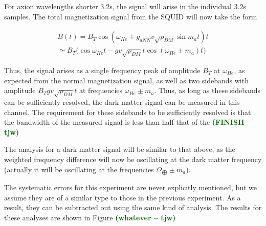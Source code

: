 \documentclass[aps,prd,final,letterpaper]{revtex4}
\newcommand{\tjw}[1]{\textbf{\textcolor{darkgreen}{(#1 -- tjw)}}}
\begin{document}
For axion wavelengths shorter $3.2$s, the signal will arise in the individual $3.2$s samples. The total magnetization signal from the SQUID will now take the form

\begin{align}
B(t) = B_T\cos{\left(\omega_{He} + g_{aNN}v\sqrt{\rho_{DM}}\sin{m_a t}\right)t} \\
\simeq B_T\bigg(\cos{\omega_{He}t} - gv\sqrt{\rho_{DM}}t\cos{(\omega_{He} \pm m_a)t}\bigg)
\end{align}

Thus, the signal arises as a single frequency peak of amplitude $B_T$ at $\omega_{He}$, as expected from the normal magnetization signal, as well as two sidebands with amplitude $B_Tgv\sqrt{\rho_{DM}}t$ at frequencies $\omega_{He} \pm m_a$. Thus, as long as these sidebands can be sufficiently resolved, the dark matter signal can be measured in this channel. The requirement for these sidebands to be sufficiently resolved is that the bandwidth of the measured signal is less than half that of the 
\tjw{FINISH}

The analysis for a dark matter signal will be similar to that above, as the weighted frequency difference will now be oscillating at the dark matter frequency (actually it will be oscillating at the frequencies $\Omega_{\bigoplus} \pm m_a$). 

The systematic errors for this experiment are never explicitly mentioned, but we assume they are of a similar type to those in the previous experiment. As a result, they can be subtracted out using the same kind of analysis. The results for these analyses are shown in Figure \tjw{whatever}



\begingroup
\renewcommand{\section}[2]{}%
\begin{thebibliography}{100}


\end{thebibliography}
\end{document}
